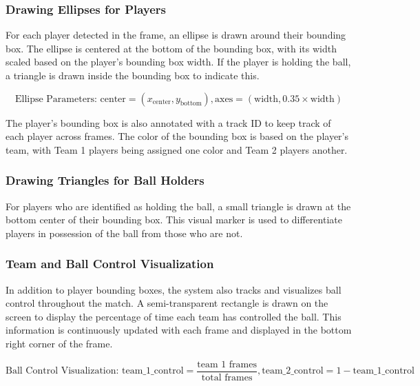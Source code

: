 \subsubsection{Drawing Ellipses for Players}

For each player detected in the frame, an ellipse is drawn around their bounding box. The ellipse is centered at the bottom of the bounding box, with its width scaled based on the player's bounding box width. If the player is holding the ball, a triangle is drawn inside the bounding box to indicate this.

\begin{equation}
\text{Ellipse Parameters: } \text{center} = (x_{\text{center}}, y_{\text{bottom}}), \text{axes} = (\text{width}, 0.35 \times \text{width})
\end{equation}

The player’s bounding box is also annotated with a track ID to keep track of each player across frames. The color of the bounding box is based on the player's team, with Team 1 players being assigned one color and Team 2 players another.

\subsubsection{Drawing Triangles for Ball Holders}

For players who are identified as holding the ball, a small triangle is drawn at the bottom center of their bounding box. This visual marker is used to differentiate players in possession of the ball from those who are not.

\subsubsection{Team and Ball Control Visualization}

In addition to player bounding boxes, the system also tracks and visualizes ball control throughout the match. A semi-transparent rectangle is drawn on the screen to display the percentage of time each team has controlled the ball. This information is continuously updated with each frame and displayed in the bottom right corner of the frame.

\begin{equation}
\text{Ball Control Visualization: } \text{team\_1\_control} = \frac{\text{team 1 frames}}{\text{total frames}}, \text{team\_2\_control} = 1 - \text{team\_1\_control}
\end{equation}






